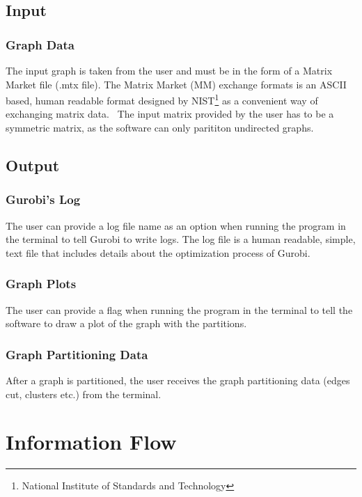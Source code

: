 \documentclass[a4paper,12pt]{report}
\begin{document}
\subsection{Input}

\subsubsection{Graph Data}
The input graph is taken from the user and must be in the form of a Matrix Market file (.mtx file). The Matrix Market (MM) exchange formats is an ASCII based, human readable format designed by NIST\footnote{National Institute of Standards and Technology} as a convenient way of exchanging matrix data.~\cite{matrix-market} The input matrix provided by the user has to be a symmetric matrix, as the software can only parititon undirected graphs.

\subsection{Output}
\subsubsection{Gurobi's Log}
The user can provide a log file name as an option when running the program in the terminal to tell Gurobi to write logs. The log file is a human readable, simple, text file that includes details about the optimization process of Gurobi.

\subsubsection{Graph Plots}
The user can provide a flag when running the program in the terminal to tell the software to draw a plot of the graph with the partitions.

\subsubsection{Graph Partitioning Data}

After a graph is partitioned, the user receives the graph partitioning data (edges cut, clusters etc.) from the terminal.


\section{Information Flow}
\end{document}
